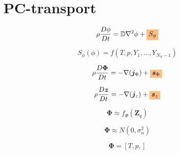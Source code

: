 \documentclass[20pt,twocolumn]{article}
\newcommand{\highlight}[1]{%
  \colorbox{orange!50}{$\displaystyle#1$}}
\begin{document}

\vspace{10mm}

\setlength{\parindent}{0cm}

\section{PC-transport}

\LARGE
\begin{equation*}
\rho \frac{D \phi}{Dt} = \mathbb{D} \nabla^2 \phi + \highlight{S_{\phi}}
\end{equation*}

\begin{equation*}
S_{\phi}(\phi) = f(T, p, Y_1, \dots, Y_{N_S - 1})
\end{equation*}

\begin{equation*}
\rho \frac{D \bm{\Phi}}{Dt} = - \nabla (\bm{j}_{\Phi}) + \highlight{\bm{s}_{\Phi}}
\end{equation*}

\begin{equation*}
\rho \frac{D \bm{z}}{Dt} = - \nabla (\bm{j}_{z}) + \highlight{\bm{s}_{z}}
\end{equation*}

\begin{equation*}
\bm{\Phi} \approx f_{\Phi} (\bm{Z}_q)
\end{equation*}

\begin{equation*}
\bm{\Phi} \approx N (0, \sigma_{n}^2)
\end{equation*}

\begin{equation*}
\bm{\Phi} = [T, p, ]
\end{equation*}
\end{document}
